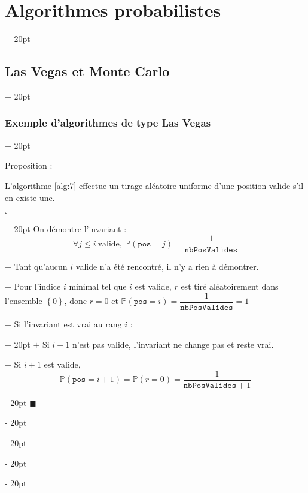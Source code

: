 \documentclass[a4paper, 12pt, twoside]{article}
\newenvironment{indalgo}[2][H]{
    \begin{algoBox}
        \begin{algorithm}[#1]
            \caption{#2}
}
{
        \end{algorithm}
    \end{algoBox}
}
\newcommand{\set}[1]{\left\{ #1 \right\}}
\renewcommand{\le}{\leqslant}
\newcommand{\ind}[1][20pt]{\advance\leftskip + #1}
\newcommand{\deind}[1][20pt]{\advance\leftskip - #1}
\newenvironment{indt}[2][20pt]{#2 \par \ind[#1]}{\par \deind} %
\newenvironment{proof}[1][{}]{\begin{indt}{$\square$ #1}}{$\blacksquare$ \end{indt}}
\newcommand{\1}{\mathbbm 1}
\begin{document}
\begin{indt}{\section{Algorithmes probabilistes}}
\begin{indt}{\subsection{Las Vegas et Monte Carlo}}
\begin{indt}{\subsubsection{Exemple d'algorithmes de type Las Vegas}}
\begin{indalgo}{Tirage aléatoire uniforme de la position}
{{                            
                        }
                    }

                \end{indalgo}

                \vspace{6pt}
                
                Proposition :
                \begin{emphBox}
                    L'algorithme \ref{alg:7} effectue un tirage aléatoire uniforme d'une position valide s'il en existe une.
                \end{emphBox}

                \vspace{6pt}
                
                \begin{proof}
                    On démontre l'invariant :
                    \[
                        \forall j \le i\ \text{valide},\
                        \mathbb P(\mathtt{pos} = j) = \dfrac{1}{\mathtt{nbPosValides}}
                    \]

                    $-$ Tant qu'aucun $i$ valide n'a été rencontré, il n'y a rien à démontrer.

                    $-$ Pour l'indice $i$ minimal tel que $i$ est valide, $r$ est tiré aléatoirement dans l'ensemble $\set 0$, donc $r = 0$ et $\mathbb P(\mathtt{pos} = i) = \dfrac{1}{\mathtt{nbPosValides}} = 1$

                    \begin{indt}{$-$ Si l'invariant est vrai au rang $i$ :}
                        $+$ Si $i + 1$ n'est pas valide, l'invariant ne change pas et reste vrai.

                        $+$ Si $i + 1$ est valide,
                        \[
                            \mathbb P(\mathtt{pos} = i + 1)
                            = \mathbb P(r = 0)
                            = \dfrac 1 {\mathtt{nbPosValides} + 1}
                        \]


\end{indt}
\end{proof}
\end{indt}
\end{indt}
\end{indt}
\end{document}
